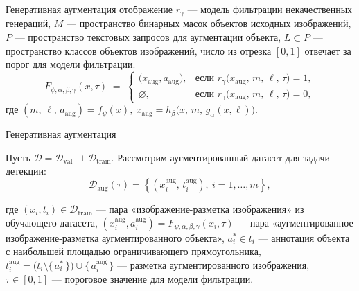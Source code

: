 \documentclass{beamer}
\begin{document}
\begin{frame}{Генеративная аугментация}
отображение $r_{\gamma}$ — модель фильтрации некачественных генераций,
$M$ — пространство бинарных масок объектов исходных изображений,  $P$ — пространство текстовых запросов для аугментации объекта, 
$L \subset P$ — пространство классов объектов изображений,
число из отрезка $[0,1]$ отвечает за порог для модели фильтрации.
\[
F_{\psi,\alpha,\beta,\gamma}(x, \tau) \;=\;
\begin{cases}
\bigl(x_\mathrm{aug}, a_\mathrm{aug}), 
& \text{если } r_{\gamma}\bigl(x_\mathrm{aug},\,m,\,\ell,\,\tau\bigr) = 1,\\[1em]
\varnothing, 
& \text{если } r_{\gamma}\bigl(x_\mathrm{aug},\,m,\,\ell,\,\tau\bigr) = 0,
\end{cases}
\]
где 
$ 
(m,\,\ell,\, a_\mathrm{aug}) = f_{\psi}(x),  \ x_\mathrm{aug} = h_{\beta}\bigl(x,\,m,\,g_{\alpha}(x, \ell)\bigr)$.
\end{frame}

\begin{frame}{Генеративная аугментация}


Пусть $\mathcal{D} = \mathcal{D}_{\text{val}} \ \sqcup \ \mathcal{D}_{\text{train}}$. Рассмотрим аугментированный датасет для задачи детекции:
\[
\mathcal{D}_{\text{aug}}(\tau) =
\left\{
  (x_i^{\text{aug}},\,t_i^{\text{aug}}), \
  i = 1,\dots,m
\right\},
\]

где $(x_i, t_i) \in \mathcal{D}_{\mathrm{train}}$ — пара «изображение-разметка изображения» из обучающего датасета,
$(x_i^{\mathrm{aug}}, a_i^{\mathrm{aug}}) = F_{\psi,\alpha,\beta,\gamma}(x_i, \tau)$ — пара «аугментированное изображение-разметка аугментированного объекта»,
$a_i^* \in t_i$ — аннотация объекта с наибольшей площадью ограничивающего прямоугольника,
$t_i^{\mathrm{aug}} = \bigl(t_i \setminus \{\,a_i^*\,\}\bigr) \cup \{\,a_i^{\mathrm{aug}}\,\}$ — разметка аугментированного изображения,
$\tau \in [0,1]$ — пороговое значение для модели фильтрации.

\end{frame}
\end{document}

